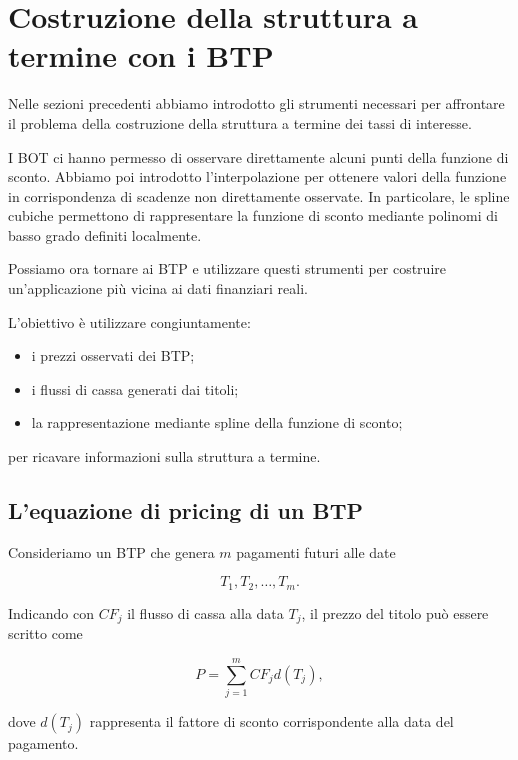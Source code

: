 \section{Costruzione della struttura a termine con i BTP}
\label{sec:term-structure-btp}

Nelle sezioni precedenti abbiamo introdotto gli strumenti necessari
per affrontare il problema della costruzione della struttura a termine
dei tassi di interesse.

I BOT ci hanno permesso di osservare direttamente alcuni punti della
funzione di sconto. Abbiamo poi introdotto l'interpolazione per
ottenere valori della funzione in corrispondenza di scadenze non
direttamente osservate. In particolare, le spline cubiche permettono
di rappresentare la funzione di sconto mediante polinomi di basso
grado definiti localmente.

Possiamo ora tornare ai BTP e utilizzare questi strumenti per
costruire un'applicazione più vicina ai dati finanziari reali.

L'obiettivo è utilizzare congiuntamente:

\begin{itemize}
    \item i prezzi osservati dei BTP;
    \item i flussi di cassa generati dai titoli;
    \item la rappresentazione mediante spline della funzione di sconto;
\end{itemize}

per ricavare informazioni sulla struttura a termine.


\subsection{L'equazione di pricing di un BTP}

Consideriamo un BTP che genera $m$ pagamenti futuri alle date

\begin{equation*}
    T_1,T_2,\ldots,T_m.
\end{equation*}

Indicando con $CF_j$ il flusso di cassa alla data $T_j$, il prezzo
del titolo può essere scritto come

\begin{equation*}
    P
    =
    \sum_{j=1}^{m}
    CF_jd(T_j),
    \label{eq:btp-pricing-general}
\end{equation*}

dove $d(T_j)$ rappresenta il fattore di sconto corrispondente alla
data del pagamento.

